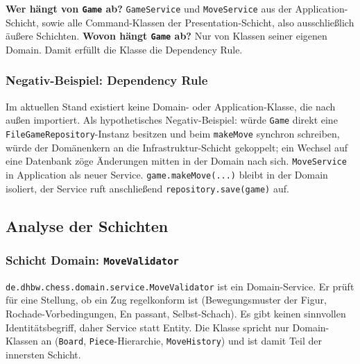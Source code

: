 \documentclass[a4paper,12pt]{article}
\begin{document}
\textbf{Wer hängt von \texttt{Game} ab?} \texttt{GameService} und \texttt{MoveService} aus der
Application-Schicht, sowie alle Command-Klassen der Presentation-Schicht, also ausschließlich
äußere Schichten. \textbf{Wovon hängt \texttt{Game} ab?} Nur von Klassen seiner eigenen Domain.
Damit erfüllt die Klasse die Dependency Rule.

\subsubsection*{Negativ-Beispiel: Dependency Rule}

Im aktuellen Stand existiert keine Domain- oder Application-Klasse, die nach außen importiert. Als
hypothetisches Negativ-Beispiel: würde \texttt{Game} direkt eine \texttt{FileGameRepository}-Instanz
besitzen und beim \texttt{makeMove} synchron schreiben, würde der Domänenkern an die
Infrastruktur-Schicht gekoppelt; ein Wechsel auf eine Datenbank zöge Änderungen mitten in der
Domain nach sich. \texttt{MoveService} in Application als neuer Service.
\texttt{game.makeMove(...)} bleibt in der Domain isoliert, der Service ruft anschließend
\texttt{repository.save(game)} auf.

\subsection*{Analyse der Schichten}

\subsubsection*{Schicht Domain: \texttt{MoveValidator}}

\texttt{de.dhbw.chess.domain.service.MoveValidator} ist ein Domain-Service. Er prüft für eine
Stellung, ob ein Zug regelkonform ist (Bewegungsmuster der Figur, Rochade-Vorbedingungen, En
passant, Selbst-Schach). Es gibt keinen sinnvollen Identitätsbegriff, daher Service statt Entity.
Die Klasse spricht nur Domain-Klassen an (\texttt{Board}, \texttt{Piece}-Hierarchie,
\texttt{MoveHistory}) und ist damit Teil der innersten Schicht.

\end{document}
